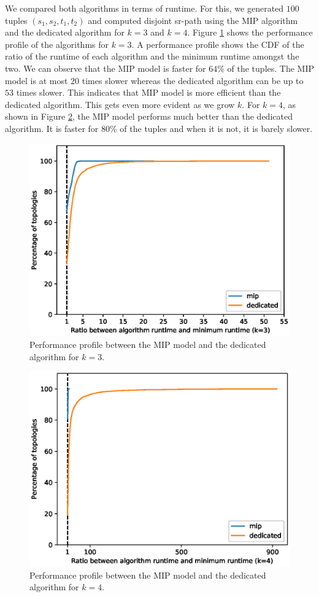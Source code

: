 We compared both algorithms in terms of runtime. For this, we generated $100$ tuples
$(s_1, s_2, t_1, t_2)$ and computed disjoint sr-path using the MIP algorithm and the dedicated
algorithm for $k = 3$ and $k = 4$. Figure \ref{fig:perf3} shows the performance profile of the algorithms for $k = 3$.
A performance profile shows the CDF of the ratio of the runtime of each algorithm and the minimum runtime amongst the two.
We can observe that the MIP model is faster for $64\%$ of the tuples. The MIP model is at most
$20$ times slower whereas the dedicated algorithm can be up to $53$ times slower. This 
indicates that MIP model is more efficient than the dedicated algorithm. This gets
even more evident as we grow $k$. For $k = 4$, as shown in Figure \ref{fig:perf4},
the MIP model performs much better than the dedicated algorithm. It is faster for $80\%$
of the tuples and when it is not, it is barely slower.

\begin{figure}
\begin{center}
\includegraphics[width=.85\columnwidth]{./Network-lib/data/plot/2SREDP_3.eps}
\end{center}
\caption{Performance profile between the MIP model and the dedicated algorithm for $k = 3$.}
\label{fig:perf3}
\end{figure}

\begin{figure}
\begin{center}
\includegraphics[width=.85\columnwidth]{./Network-lib/data/plot/2SREDP_4.eps}
\end{center}
\caption{Performance profile between the MIP model and the dedicated algorithm for $k = 4$.}
\label{fig:perf4}
\end{figure}



